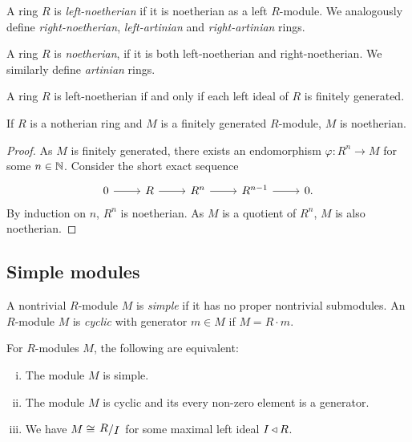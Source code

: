 
\begin{definicija}
A ring $R$ is \emph{left-noetherian} if it
is noetherian as a left $R$-module. We analogously define
\emph{right-noetherian}, \emph{left-artinian}
and \emph{right-artinian} rings.

A ring $R$ is \emph{noetherian}, if it is both left-noetherian and
right-noetherian. We similarly define \emph{artinian} rings.
\end{definicija}

\begin{opomba}
A ring $R$ is left-noetherian if and only if each left ideal of $R$
is finitely generated.
\end{opomba}

\begin{trditev}
If $R$ is a notherian ring and $M$ is a finitely generated
$R$-module, $M$ is noetherian.
\end{trditev}

\begin{proof}
As $M$ is finitely generated, there exists an endomorphism
$\varphi \colon R^n \to M$ for some $n \in \mathbb{N}$. Consider the short
exact sequence
\[
\begin{tikzcd}
0 \arrow[r] & R \arrow[r] & R^n \arrow[r] & R^{n-1} \arrow[r] & 0.
\end{tikzcd}
\]
By induction on $n$, $R^n$ is noetherian. As $M$ is a quotient of
$R^n$, $M$ is also noetherian.
\end{proof}

\newpage

\subsection{Simple modules}

\begin{definicija}
A nontrivial $R$-module $M$ is \emph{simple}
if it has no proper nontrivial submodules. An $R$-module $M$ is
\emph{cyclic} with generator $m \in M$ if
$M = R \cdot m$.
\end{definicija}

\begin{trditev}
For $R$-modules $M$, the following are equivalent:

\begin{enumerate}[i)]
\item The module $M$ is simple.
\item The module $M$ is cyclic and its every non-zero element is a
generator.
\item We have $M \cong \kvoc{R}{I}$ for some maximal left ideal
$I \triangleleft R$.
\end{enumerate}
\end{trditev}

